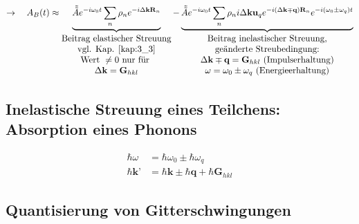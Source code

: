 \begin{align*}
	\rightarrow \quad A_B(t) \approx \underbrace{\tilde{\tilde{A}} e^{-i\omega_0 t} \sum_n \rho_n e^{-i\Delta \textbf{k} \textbf{R}_n }}_{\begin{matrix}
		\text{Beitrag elastischer Streuung}\\
		\text{vgl. Kap. \ref{kap:3_3}}\\
		\text{Wert } \neq 0 \text{ nur für }\\
		\Delta \textbf{k} = \textbf{G}_{hkl}
	\end{matrix}} - \underbrace{\tilde{\tilde{A}} e^{-i\omega_0 t} \sum_n \rho_n i\Delta \textbf{k} \textbf{u}_q e^{-i(\Delta \textbf{k} \mp \textbf{q}) \textbf{R}_n} e^{-i(\omega_0 \pm \omega_q) t}}_{\begin{matrix}
		\text{Beitrag inelastischer Streuung,} \\
		\text{geänderte Streubedingung:}\\
		\Delta \textbf{k} \mp \textbf{q} = \textbf{G}_{hkl} \text{ (Impulserhaltung)}\\
		\omega = \omega_0 \pm \omega_q \text{ (Energieerhaltung)}
	\end{matrix}}
\end{align*}

\subsection*{Inelastische Streuung eines Teilchens: Absorption eines Phonons}

\begin{align*}
	\hbar \omega &= \hbar \omega_0 \pm \hbar \omega_q\\
	\hbar \textbf{k'} &= \hbar \textbf{k} \pm \hbar \textbf{q} + \hbar \textbf{G}_{hkl}
\end{align*}

\subsection{Quantisierung von Gitterschwingungen}  \label{kap:4_4}

